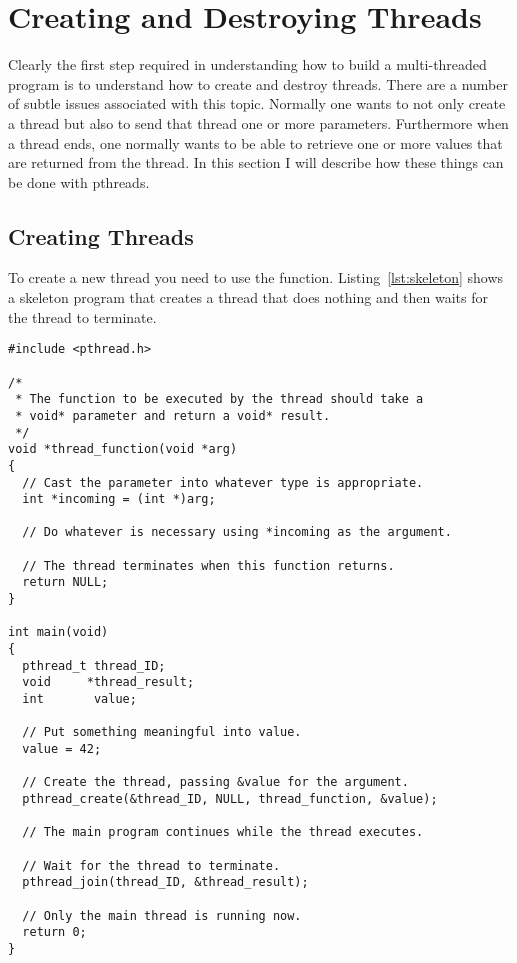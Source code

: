 
\section{Creating and Destroying Threads}
\label{sec:createdestroy-threads}

Clearly the first step required in understanding how to build a multi-threaded program is to
understand how to create and destroy threads. There are a number of subtle issues associated
with this topic. Normally one wants to not only create a thread but also to send that thread one
or more parameters. Furthermore when a thread ends, one normally wants to be able to retrieve one
or more values that are returned from the thread. In this section I will describe how these
things can be done with pthreads.

\subsection{Creating Threads}
\label{subsec:creating-threads}

To create a new thread you need to use the  function.
Listing~\ref{lst:skeleton} shows a skeleton program that creates a thread that does nothing and
then waits for the thread to terminate.

\begin{lstlisting}[float=tp,frame=single,xleftmargin=0in,
  caption={Skeleton Thread Program},label=lst:skeleton]  
#include <pthread.h>

/*
 * The function to be executed by the thread should take a
 * void* parameter and return a void* result.
 */
void *thread_function(void *arg)
{
  // Cast the parameter into whatever type is appropriate.
  int *incoming = (int *)arg;

  // Do whatever is necessary using *incoming as the argument.

  // The thread terminates when this function returns.
  return NULL;
}

int main(void)
{
  pthread_t thread_ID;
  void     *thread_result;
  int       value;

  // Put something meaningful into value.
  value = 42;

  // Create the thread, passing &value for the argument.
  pthread_create(&thread_ID, NULL, thread_function, &value);

  // The main program continues while the thread executes.

  // Wait for the thread to terminate.
  pthread_join(thread_ID, &thread_result);

  // Only the main thread is running now.
  return 0;
}
\end{lstlisting}


